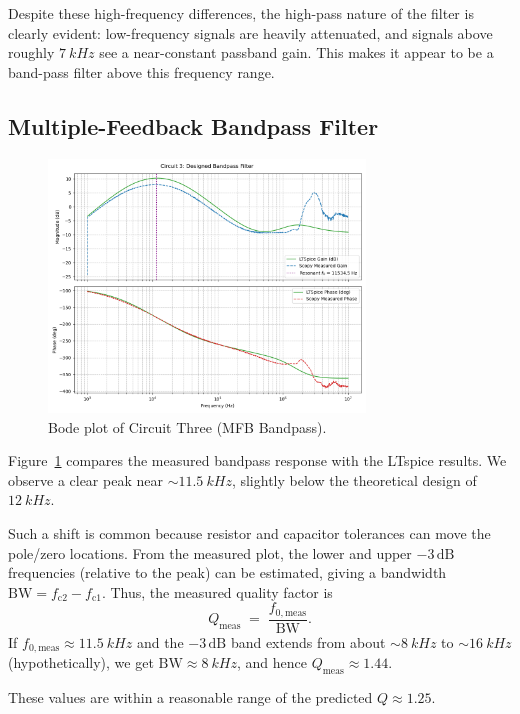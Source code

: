 \documentclass[12pt]{article}
\begin{document}
Despite these high-frequency differences, the high-pass nature of the filter is
clearly evident: low-frequency signals are heavily attenuated, and signals above
roughly $\SI{7}{kHz}$ see a near-constant passband gain. This makes it appear to
be a band-pass filter above this frequency range.

\subsection{Multiple-Feedback Bandpass Filter}

\begin{figure}[H]
	\centering
	\includegraphics[width=0.75\textwidth]{07_bode3}
	\caption{Bode plot of Circuit Three (MFB Bandpass).}
	\label{fig:bode3}
\end{figure}

Figure~\ref{fig:bode3} compares the measured bandpass response with the LTspice
results. We observe a clear peak near $\sim\SI{11.5}{kHz}$, slightly below
the theoretical design of $\SI{12}{kHz}$.

Such a shift is common because resistor and capacitor tolerances can move the
pole/zero locations. From the measured plot, the lower and upper
$-3\,\mathrm{dB}$ frequencies (relative to the peak) can be estimated, giving a
bandwidth $\mathrm{BW} = f_{\mathrm{c2}} - f_{\mathrm{c1}}$. Thus, the measured
quality factor is
\[
Q_{\text{meas}} \;=\; \frac{f_{0,\text{meas}}}{\mathrm{BW}}.
\]
If $f_{0,\text{meas}} \approx \SI{11.5}{kHz}$ and the $-3\,\mathrm{dB}$ band extends
from about $\sim\SI{8}{kHz}$ to $\sim\SI{16}{kHz}$ (hypothetically), we get
$\mathrm{BW} \approx \SI{8}{kHz}$, and hence $Q_{\text{meas}} \approx 1.44$.

These values are within a reasonable range of the predicted $Q\approx1.25$.
\end{document}
